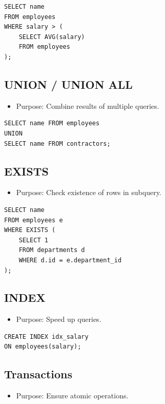 \documentclass[10pt]{article}
\begin{document}
\begin{verbatim}
SELECT name
FROM employees
WHERE salary > (
    SELECT AVG(salary)
    FROM employees
);
\end{verbatim}

\subsection{UNION / UNION ALL}
\begin{itemize}
    \item Purpose: Combine results of multiple queries.
\end{itemize}

\begin{verbatim}
SELECT name FROM employees
UNION
SELECT name FROM contractors;
\end{verbatim}

\subsection{EXISTS}
\begin{itemize}
    \item Purpose: Check existence of rows in subquery.
\end{itemize}

\begin{verbatim}
SELECT name
FROM employees e
WHERE EXISTS (
    SELECT 1
    FROM departments d
    WHERE d.id = e.department_id
);
\end{verbatim}

\subsection{INDEX}
\begin{itemize}
    \item Purpose: Speed up queries.
\end{itemize}

\begin{verbatim}
CREATE INDEX idx_salary
ON employees(salary);
\end{verbatim}

\subsection{Transactions}
\begin{itemize}
    \item Purpose: Ensure atomic operations.
\end{itemize}
\end{document}
